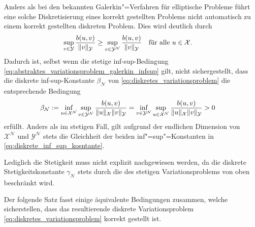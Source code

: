 \documentclass[../main.tex]{subfiles}
\begin{document}
\begin{Bemerkung}
    \label{bemerkung:zur_wohldefiniertheit}
    Anders als bei den bekannten Galerkin"=Verfahren für elliptische Probleme führt eine solche Diskretisierung eines korrekt gestellten Problems nicht automatisch zu einem korrekt gestellten diskreten Problem.
    Dies wird deutlich durch
    \begin{equation}
        \sup_{v \in \mathcal Y} \frac{b(u, v)}{\norm{v}_{\mathcal Y}} \geq \sup_{v \in \mathcal Y^{\mathcal N}} \frac{b(u, v)}{\norm{v}_{\mathcal Y}} \quad \fa u \in \mathcal X.
    \end{equation}
    Dadurch ist, selbst wenn die stetige inf-sup-Bedingung \cref{eq:abstraktes_variationsproblem_galerkin_infsup} gilt, nicht sichergestellt, dass die diskrete inf-sup-Konstante $\beta_{\mathcal N}$ von \cref{eq:diskretes_variationsproblem} die entsprechende Bedingung
    \begin{equation}
        \label{eq:diskrete_inf_sup_kosntante}
        \beta_{\mathcal N} := \inf_{u \in \mathcal X^{\mathcal N}} \sup_{v \in \mathcal Y^{\mathcal N}} \frac{b(u, v)}{\norm{u}_{\mathcal X} \norm{v}_{\mathcal Y}} = \inf_{v \in \mathcal Y^{\mathcal N}} \sup_{u \in \mathcal X^{\mathcal N}} \frac{b(u, v)}{\norm{u}_{\mathcal X} \norm{v}_{\mathcal Y}} > 0
    \end{equation}
    erfüllt.
   Anders als im stetigen Fall, gilt aufgrund der endlichen Dimension von $\mathcal X^{\mathcal N}$ und $\mathcal Y^{\mathcal N}$ stets die Gleichheit der beiden inf"=sup"=Konstanten in \cref{eq:diskrete_inf_sup_kosntante}.

   Lediglich die Stetigkeit muss nicht explizit nachgewiesen werden, da die diskrete Stetigkeitskonstante $\gamma_{\mathcal N}$ stets durch die des stetigen Variationsproblems von oben beschränkt wird.
\end{Bemerkung}

Der folgende Satz fasst einige äquivalente Bedingungen zusammen, welche sicherstellen, dass das resultierende diskrete Variationsproblem \cref{eq:diskretes_variationsproblem} korrekt gestellt ist.
\end{document}
